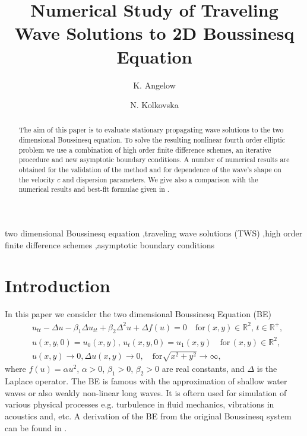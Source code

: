 \documentclass[preprint]{elsarticle}
\newcommand{\RR}{\mathbb{R}}
\begin{document}
\begin{frontmatter}

\title{Numerical Study of Traveling Wave Solutions to 2D Boussinesq  Equation}


\author{K. Angelow}
\author{N. Kolkovska}

\address{Institute of Mathematics and Informatics, Bulgarian Academy of Sciences, Acad. G.~Bonchev Bl.8, 1113 Sofia, Bulgaria}

\begin{abstract}
The aim of this paper is to evaluate stationary  propagating  wave solutions  
 to the two dimensional Boussinesq  equation. To solve the resulting nonlinear fourth order elliptic  problem we use a  combination of high order finite difference schemes, an iterative procedure  and  new asymptotic boundary conditions.   A number of numerical results are obtained for the validation of the method and for dependence of the wave's shape on the velocity $c$ and dispersion parameters. We give also a comparison with  the numerical results and best-fit formulae given in \cite{Ch2011,Ch2012}.

\end{abstract}
\begin{keyword}
two dimensional Boussinesq  equation \sep traveling wave solutions (TWS) \sep high order finite difference schemes \sep asymptotic boundary conditions
 \end{keyword}
\end{frontmatter}


\section{Introduction}\label{introduction}

In this paper we  consider the two dimensional Boussinesq  Equation (BE)
\begin{align}
&u_{tt} - \Delta u -\beta_1  \Delta u_{tt} +\beta_2 \Delta ^2 u + \Delta f(u)=0   \quad \text{for}  (x,y) \in \RR^2, \, t\in\RR^+,\label{eq1}
\\ \nonumber &u(x,y,0)=u_0(x,y), \, u_t(x,y,0)=u_1(x,y)   \quad\text{for} \, (x,y) \in \RR^2,
\\  &u(x,y) \rightarrow 0,  \Delta u(x,y) \rightarrow 0 ,  \quad \text{for}  \sqrt{x^2 + y^2} \rightarrow \infty, \label{eq11}
\end{align}
where   $f(u)=\alpha u^2$,  $\alpha>0$, $\beta_1>0$, $\beta_2>0$  are real constants, and $\Delta$ is the Laplace operator. The BE is famous with the approximation of shallow water waves or also weakly non-linear long waves. It is oftern used for simulation of various physical processes e.g. turbulence in fluid mechanics, vibrations in acoustics and, etc. A derivation of the BE from the original Boussinesq system can be found in \cite{ChChr}.
\end{document}
